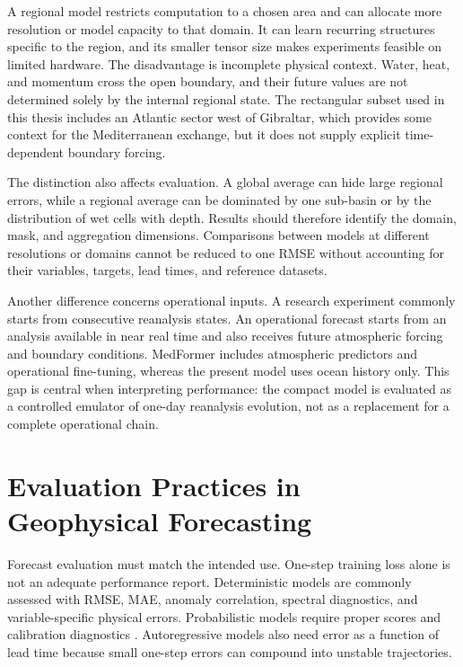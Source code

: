 A regional model restricts computation to a chosen area and can allocate more resolution or model capacity to that domain. It can learn recurring structures specific to the region, and its smaller tensor size makes experiments feasible on limited hardware. The disadvantage is incomplete physical context. Water, heat, and momentum cross the open boundary, and their future values are not determined solely by the internal regional state. The rectangular subset used in this thesis includes an Atlantic sector west of Gibraltar, which provides some context for the Mediterranean exchange, but it does not supply explicit time-dependent boundary forcing.

The distinction also affects evaluation. A global average can hide large regional errors, while a regional average can be dominated by one sub-basin or by the distribution of wet cells with depth. Results should therefore identify the domain, mask, and aggregation dimensions. Comparisons between models at different resolutions or domains cannot be reduced to one RMSE without accounting for their variables, targets, lead times, and reference datasets.

Another difference concerns operational inputs. A research experiment commonly starts from consecutive reanalysis states. An operational forecast starts from an analysis available in near real time and also receives future atmospheric forcing and boundary conditions. MedFormer includes atmospheric predictors and operational fine-tuning, whereas the present model uses ocean history only. This gap is central when interpreting performance: the compact model is evaluated as a controlled emulator of one-day reanalysis evolution, not as a replacement for a complete operational chain.

\section{Evaluation Practices in Geophysical Forecasting}

Forecast evaluation must match the intended use. One-step training loss alone is not an adequate performance report. Deterministic models are commonly assessed with RMSE, MAE, anomaly correlation, spectral diagnostics, and variable-specific physical errors. Probabilistic models require proper scores and calibration diagnostics \citep{gneiting2007scoring}. Autoregressive models also need error as a function of lead time because small one-step errors can compound into unstable trajectories.

